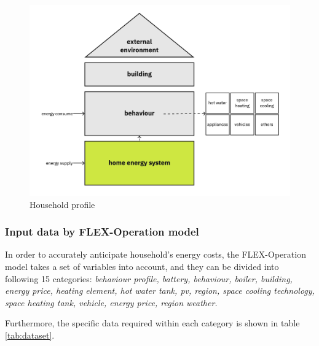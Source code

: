 \begin{figure}[h]
    \centering
    \includegraphics[width=\textwidth]{Images/household_profile.jpg}
    \caption{Household profile}
    \label{fig:profile}
  \end{figure}

\subsubsection{Input data by FLEX-Operation model}

In order to accurately anticipate household's energy costs,
the FLEX-Operation model takes a set of variables into account,
and they can be divided into following 15 categories: 
\emph{
    behaviour profile,
    battery,
    behaviour, 
    boiler,
    building,
    energy price,
    heating element, 
    hot water tank,
    \gls{pv},
    region,
    space cooling technology,
    space heating tank,
    vehicle,
    energy price,
    region weather. 
}

Furthermore, the specific data required within each category is shown in table \ref{tab:dataset}. 

